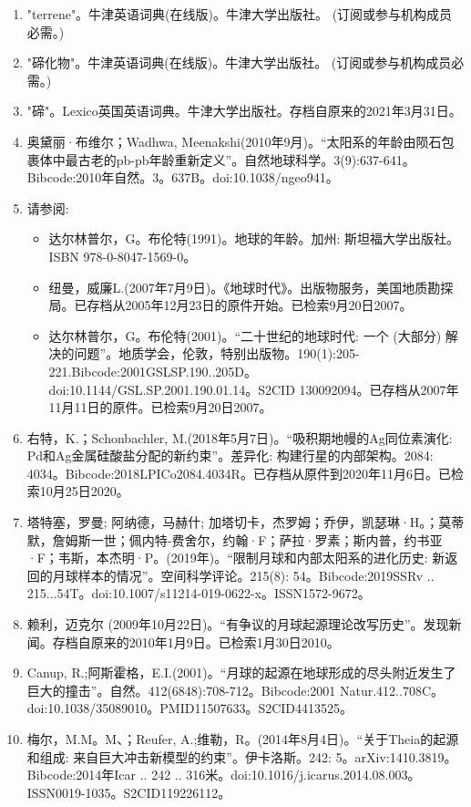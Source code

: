 \begin{enumerate}
\item "terrene"。牛津英语词典(在线版)。牛津大学出版社。 (订阅或参与机构成员必需。)
\item "碲化物"。牛津英语词典(在线版)。牛津大学出版社。 (订阅或参与机构成员必需。)
\item "碲"。Lexico英国英语词典。牛津大学出版社。存档自原来的2021年3月31日。
\item 奥黛丽·布维尔；Wadhwa, Meenakshi(2010年9月)。“太阳系的年龄由陨石包裹体中最古老的pb-pb年龄重新定义”。自然地球科学。3(9):637-641。Bibcode:2010年自然。3。637B。doi:10.1038/ngeo941。
\item 请参阅:
\begin{itemize}
\item 达尔林普尔，G。布伦特(1991)。地球的年龄。加州: 斯坦福大学出版社。ISBN 978-0-8047-1569-0。
\item 纽曼，威廉L.(2007年7月9日)。《地球时代》。出版物服务，美国地质勘探局。已存档从2005年12月23日的原件开始。已检索9月20日2007。
\item 达尔林普尔，G。布伦特(2001)。“二十世纪的地球时代: 一个 (大部分) 解决的问题”。地质学会，伦敦，特别出版物。190(1):205-221.Bibcode:2001GSLSP.190..205D。doi:10.1144/GSL.SP.2001.190.01.14。S2CID 130092094。已存档从2007年11月11日的原件。已检索9月20日2007。
\end{itemize}
\item 右特，K.；Schonbachler, M.(2018年5月7日)。“吸积期地幔的Ag同位素演化: Pd和Ag金属硅酸盐分配的新约束”。差异化: 构建行星的内部架构。2084: 4034。Bibcode:2018LPICo2084.4034R。已存档从原件到2020年11月6日。已检索10月25日2020。
\item 塔特塞，罗曼; 阿纳德，马赫什; 加塔切卡，杰罗姆；乔伊，凯瑟琳·H。；莫蒂默，詹姆斯一世；佩内特-费舍尔，约翰·F；萨拉·罗素；斯内普，约书亚·F；韦斯，本杰明·P。(2019年)。“限制月球和内部太阳系的进化历史: 新返回的月球样本的情况”。空间科学评论。215(8): 54。Bibcode:2019SSRv .. 215...54T。doi:10.1007/s11214-019-0622-x。ISSN1572-9672。 
\item 赖利，迈克尔 (2009年10月22日)。“有争议的月球起源理论改写历史”。发现新闻。存档自原来的2010年1月9日。已检索1月30日2010。
\item Canup, R.;阿斯霍格，E.I.(2001)。“月球的起源在地球形成的尽头附近发生了巨大的撞击”。自然。412(6848):708-712。Bibcode:2001 Natur.412..708C。doi:10.1038/35089010。PMID11507633。S2CID4413525。  
\item 梅尔，M.M。M、；Reufer, A.;维勒，R。(2014年8月4日)。“关于Theia的起源和组成: 来自巨大冲击新模型的约束”。伊卡洛斯。242: 5。arXiv:1410.3819。Bibcode:2014年Icar .. 242 .. 316米。doi:10.1016/j.icarus.2014.08.003。ISSN0019-1035。S2CID119226112。  

\end{enumerate}
